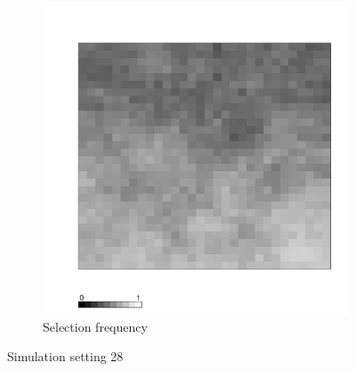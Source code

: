 \documentclass[authoryear, review, 11pt]{elsarticle}
\begin{document}
\begin{figure}
	\begin{subfigure}[b]{0.45\textwidth}
	\centering
		\includegraphics[width=\textwidth]{../../figures/simulation/X1.15.28.selection.pdf}
		\caption{Selection frequency}
	\end{subfigure}
	\caption{Simulation setting 28}
\end{figure}

\clearpage
\end{document}
